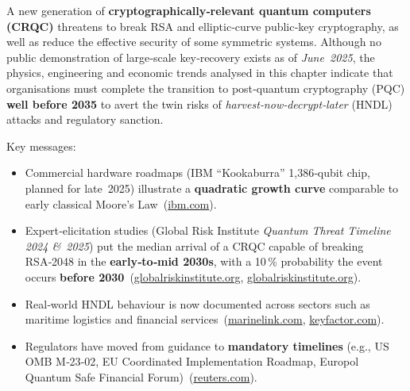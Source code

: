 \documentclass[
  english,
]{article}
\providecommand{\tightlist}{%
  \setlength{\itemsep}{0pt}\setlength{\parskip}{0pt}}
\begin{document}
A new generation of \textbf{cryptographically‑relevant quantum computers
(CRQC)} threatens to break RSA and elliptic‑curve public‑key
cryptography, as well as reduce the effective security of some symmetric
systems. Although no public demonstration of large‑scale key‑recovery
exists as of \emph{June~2025}, the physics, engineering and economic
trends analysed in this chapter indicate that organisations must
complete the transition to post‑quantum cryptography (PQC) \textbf{well
before 2035} to avert the twin risks of \emph{harvest‑now‑decrypt‑later}
(HNDL) attacks and regulatory sanction.

Key messages:

\begin{itemize}
\tightlist
\item
  Commercial hardware roadmaps (IBM ``Kookaburra'' 1,386‑qubit chip,
  planned for late~2025) illustrate a \textbf{quadratic growth curve}
  comparable to early classical Moore's
  Law~(\href{https://www.ibm.com/quantum/blog/ibm-quantum-roadmap-2025?utm_source=chatgpt.com}{ibm.com}).
\item
  Expert‑elicitation studies (Global Risk Institute \emph{Quantum Threat
  Timeline 2024 \&~2025}) put the median arrival of a CRQC capable of
  breaking RSA‑2048 in the \textbf{early‑to‑mid 2030s}, with a 10\,\%
  probability the event occurs \textbf{before
  2030}~(\href{https://globalriskinstitute.org/publication/2024-quantum-threat-timeline-report/?utm_source=chatgpt.com}{globalriskinstitute.org},
  \href{https://globalriskinstitute.org/publication/quantum-threat-timeline-2025-executive-perspectives-on-barriers-to-action/?utm_source=chatgpt.com}{globalriskinstitute.org}).
\item
  Real‑world HNDL behaviour is now documented across sectors such as
  maritime logistics and financial
  services~(\href{https://www.marinelink.com/news/harvest-decrypt-later-526089?utm_source=chatgpt.com}{marinelink.com},
  \href{https://www.keyfactor.com/blog/harvest-now-decrypt-later-a-new-form-of-attack/?utm_source=chatgpt.com}{keyfactor.com}).
\item
  Regulators have moved from guidance to \textbf{mandatory timelines}
  (e.g., US OMB M‑23‑02, EU Coordinated Implementation Roadmap, Europol
  Quantum Safe Financial
  Forum)~(\href{https://www.reuters.com/technology/cybersecurity/europol-body-banks-should-prepare-quantum-computer-risk-now-2025-02-07/?utm_source=chatgpt.com}{reuters.com}).
\end{itemize}
\end{document}
